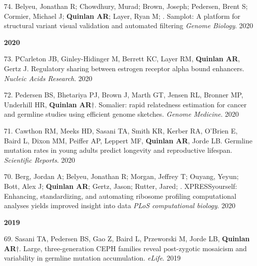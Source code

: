 \documentclass[margin,line]{cv}
\begin{document}
\begin{resume}
\begin{list}{*}{}
    \item[74.] Belyeu, Jonathan R; Chowdhury, Murad; Brown, Joseph; Pedersen, Brent S; Cormier, Michael J; \textbf{Quinlan AR}; Layer, Ryan M; . Samplot: A platform for structural variant visual validation and automated filtering \emph{Genome Biology}. 2020
   

    \end{list}  

    \textbf{2020} \\

    \begin{list}{*}{}

    \item[73.] PCarleton JB, Ginley-Hidinger M, Berrett KC, Layer RM, \textbf{Quinlan AR}, Gertz J. Regulatory sharing between estrogen receptor alpha bound enhancers. \emph{Nucleic Acids Research}. 2020

    \item[72.] Pedersen BS, Bhetariya PJ, Brown J, Marth GT, Jensen RL, Bronner MP, Underhill HR, \textbf{Quinlan AR}$\dagger$. Somalier: rapid relatedness estimation for cancer and germline studies using efficient genome sketches. \emph{Genome Medicine}. 2020

    \item[71.] Cawthon RM, Meeks HD, Sasani TA, Smith KR, Kerber RA, O'Brien E, Baird L, Dixon MM, Peiffer AP, Leppert MF, \textbf{Quinlan AR}, Jorde LB. Germline mutation rates in young adults predict longevity and reproductive lifespan. \emph{Scientific Reports}. 2020

    \item[70.] Berg, Jordan A; Belyeu, Jonathan R; Morgan, Jeffrey T; Ouyang, Yeyun; Bott, Alex J; \textbf{Quinlan AR}; Gertz, Jason; Rutter, Jared; . XPRESSyourself: Enhancing, standardizing, and automating ribosome profiling computational analyses yields improved insight into data \emph{PLoS computational biology}. 2020

    \end{list}  

    \textbf{2019} \\

    \begin{list}{*}{}

    \item[69.] Sasani TA, Pedersen BS, Gao Z, Baird L,  Przeworski M, Jorde LB, \textbf{Quinlan AR}$\dagger$. Large, three-generation CEPH families reveal post-zygotic mosaicism and variability in germline mutation accumulation. \emph{eLife}. 2019


\end{list}
\end{resume}
\end{document}
